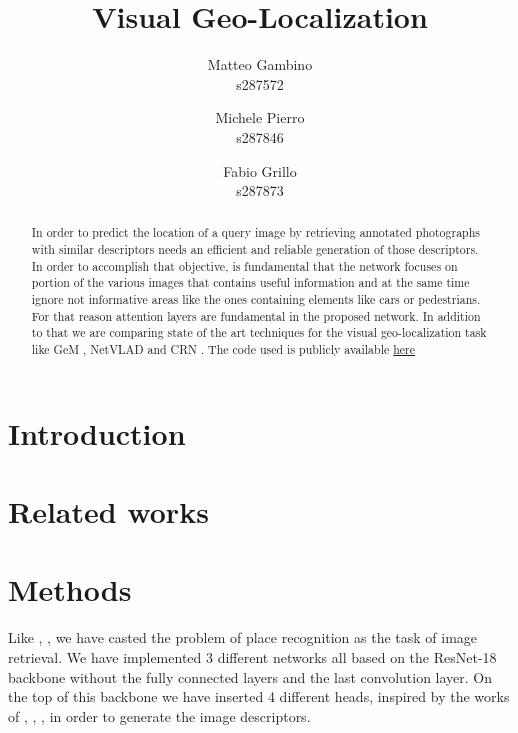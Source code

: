 \documentclass[10pt,twocolumn,letterpaper]{article}
\begin{document}
\title{Visual Geo-Localization}

\author{Matteo Gambino\\
s287572
\and
Michele Pierro\\
s287846
\and
Fabio Grillo\\
s287873
}
\maketitle

\begin{abstract}
   In order to predict the location of a query image by retrieving annotated photographs with 
   similar descriptors needs an efficient and reliable generation of those descriptors. 
   In order to accomplish that objective, is fundamental that the network focuses on portion
   of the various images that contains useful information and at the same time ignore not 
   informative areas like the ones containing elements like cars or pedestrians. For that 
   reason attention layers are fundamental in the proposed network. In addition to that we 
   are comparing state of the art techniques for the visual geo-localization task like GeM \cite{GEM}, 
   NetVLAD \cite{NETVLAD} and CRN \cite{CRN}. The code used is publicly available 
   \href{https://github.com/matteo6198/project_visual_geolocalization}{here}
\end{abstract}

\section{Introduction}

\section{Related works}

\section{Methods}
Like \cite{GEM}, \cite{NETVLAD}, \cite{CRN} we have casted the problem of place recognition as the task of image
retrieval. We have implemented 3 different networks all based on the ResNet-18 \cite{resnet} backbone
without the fully connected layers and the last convolution layer. On the top of this backbone we 
have inserted 4 different heads, inspired by the works of \cite{GEM}, \cite{NETVLAD}, \cite{CRN}, in order
to generate the image descriptors. 
\end{document}
